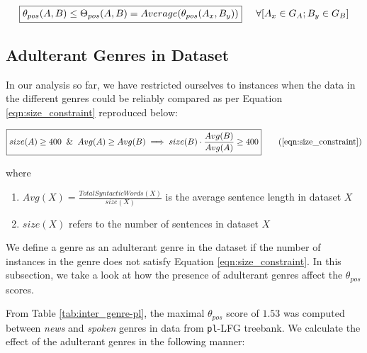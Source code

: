 \begin{equation}
    \boxed{\theta_{pos}(A, B) \leq \Theta_{pos}(A, B) = Average(\theta_{pos}(A_{x}, B_{y}))} \hspace{5mm} \forall [A_{x} \in G_{A}; B_{y} \in G_{B}]
\label{eqn:theta_pos_combo_limit}
\end{equation}

\subsection{Adulterant Genres in Dataset}
\label{sec:adulterant}

In our analysis so far, we have restricted ourselves to instances when the data in the different genres could be reliably compared as per Equation \ref{eqn:size_constraint} reproduced below:

\begin{equation}
\boxed{size(A) \geq 400 \And Avg(A) \geq Avg(B) \implies size(B) \cdot \frac{Avg(B)}{Avg(A)} \geq 400} \tag{\ref{eqn:size_constraint}}
\end{equation}

 where

\begin{enumerate}
    \item $Avg(X) = \frac{Total Syntactic Words(X)}{size(X)}$ is the average sentence length in dataset $X$
    \item $size(X)$ refers to the number of sentences in dataset $X$
\end{enumerate}


We define a genre as an adulterant genre in the dataset if the number of instances in the genre does not satisfy Equation \ref{eqn:size_constraint}. In this subsection, we take a look at how the presence of adulterant genres affect the $\theta_{pos}$ scores.

From Table \ref{tab:inter_genre-pl}, the maximal $\theta_{pos}$ score of $1.53$ was computed between \textit{news} and \textit{spoken} genres in data from \texttt{pl}-LFG treebank. We calculate the effect of the adulterant genres in the following manner:

